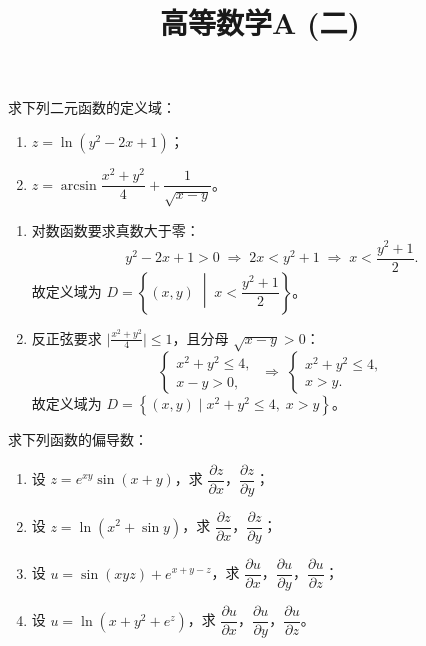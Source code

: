 \documentclass[answer]{THUExam}
\title{高等数学A (二)}
\author{}
\begin{document}
\vspace{1cm}
\makehead

\vspace{1cm}


\begin{problem}
求下列二元函数的定义域：
\begin{enumerate}
\item $z=\ln(y^2-2x+1)$；
\item $z=\arcsin\dfrac{x^2+y^2}{4}+\dfrac{1}{\sqrt{x-y}}$。
\end{enumerate}
\end{problem}

\begin{solution}
\begin{enumerate}
\item 对数函数要求真数大于零：
\[
y^2-2x+1>0 \;\Longrightarrow\; 2x<y^2+1 \;\Longrightarrow\; x<\frac{y^2+1}{2}.
\]
故定义域为 $D=\left\{(x,y)\;\middle|\;x<\dfrac{y^2+1}{2}\right\}$。

\item 反正弦要求 $\bigl|\frac{x^2+y^2}{4}\bigr|\leqslant 1$，且分母 $\sqrt{x-y}>0$：
\[
\begin{cases}
x^2+y^2\leqslant 4,\\[2pt]
x-y>0,
\end{cases}
\;\Longrightarrow\;
\begin{cases}
x^2+y^2\leqslant 4,\\
x>y.
\end{cases}
\]
故定义域为 $D=\left\{(x,y)\mid x^2+y^2\leqslant 4,\;x>y\right\}$。
\end{enumerate}
\end{solution}
\bigskip

\begin{problem}
求下列函数的偏导数：
\begin{enumerate}
\item 设 $z=e^{xy}\sin(x+y)$，求 $\dfrac{\partial z}{\partial x}$，$\dfrac{\partial z}{\partial y}$；
\item 设 $z=\ln(x^2+\sin y)$，求 $\dfrac{\partial z}{\partial x}$，$\dfrac{\partial z}{\partial y}$；
\item 设 $u=\sin(xyz)+e^{x+y-z}$，求 $\dfrac{\partial u}{\partial x}$，$\dfrac{\partial u}{\partial y}$，$\dfrac{\partial u}{\partial z}$；
\item 设 $u=\ln(x+y^2+e^z)$，求 $\dfrac{\partial u}{\partial x}$，$\dfrac{\partial u}{\partial y}$，$\dfrac{\partial u}{\partial z}$。
\end{enumerate}
\end{problem}
\end{document}
